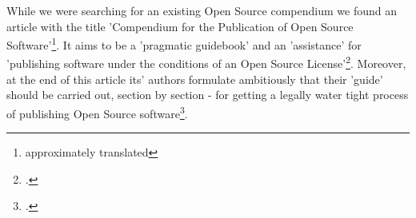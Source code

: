 %
%
%
%

%
While we were searching for an existing Open Source compendium we found an
article with the title 'Compendium for the Publication of Open Source
Software'\footnote{approximately translated}. It aims to be a 'pragmatic
guidebook' and an 'assistance' for 'publishing software under the conditions of
an Open Source License'\footcite[cf.][166f (originally: ein
\glqq{}pragmatischer Ratgeber\grqq{} zur \glqq{}Veröffentlichung einer Software
unter den Rahmenbedingungen einer Open-Source-Lizenz\grqq{}) ]{BreGlaGra2008a}.
Moreover, at the end of this article its' authors formulate ambitiously that
their 'guide' should be carried out, section by section - for getting a legally
water tight process of publishing Open Source software\footcite[cf.][186
(originally: ein \glqq{}Ratgeber\grqq{}, der es erlaubt \glqq{} (\ldots) die zu
berücksichtigende Aspekte (strukturiert abzuarbeiten) (\ldots) \grqq{} und einen
\glqq{}rechtlich nicht angreifbaren Veröffentlichungsprozess\grqq{} zu
ermöglichen) ]{BreGlaGra2008a}.

